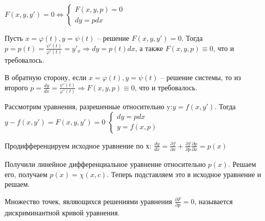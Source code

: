 \documentclass[document.tex]{subfiles}
\begin{document}
$F(x,y,y')=0 \Leftrightarrow \left\{\begin{aligned} F(x,y,p)=0\\dy=pdx \end{aligned}\right.$

Пусть $x=\varphi(t),y=\psi(t)$ -- решение $F(x,y,y')=0$. Тогда $p=p(t)=\frac{\psi'(t)}{\varphi'(t)}=y'_x\Rightarrow dy=p(t)dx$, а также $F(x,y,p)\equiv 0$, что и требовалось.

В обратную сторону, если $x=\varphi(t),y=\psi(t)$ -- решение системы, то из второго $p=\frac{dy}{dx}=\frac{\psi'(t)}{\varphi'(t)}\Rightarrow F(x,y,p)\equiv 0$, что и требовалось.
\begin{example}
Рассмотрим уравнения, разрешенные относительно y:$y=f(x,y')$. Тогда $y-f(x,y')=F(x,y,y')=0$
$
\left\{\begin{aligned}dy=pdx\\y=f(x,p) \end{aligned}\right.$

Продифференцируем исходное уравнение по х:
$\frac{dy}{dx}=\frac{\partial f}{\partial x} + \frac{\partial f}{\partial p}\frac{\partial p}{\partial x} = p(x)$

Получили линейное дифференциальное уравнение относительно $p(x)$. Решаем его, получаем $p(x)=\chi(x,c)$. Теперь подставляем это в исходное уравнение и решаем.
\end{example}
\begin{definition}
Множество точек, являющихся решениями уравнения $\frac{\partial F}{\partial p}=0$, называется дискриминантной кривой уравнения.
\end{definition}
\end{document}
